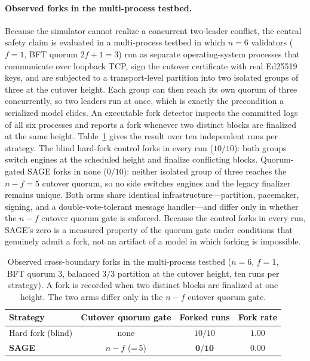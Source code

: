 \documentclass[journal]{IEEEtran}
\begin{document}
\paragraph{Observed forks in the multi-process testbed.}
Because the simulator cannot realize a concurrent two-leader conflict, the central safety claim
is evaluated in a multi-process testbed in which $n{=}6$ validators ($f{=}1$, BFT quorum
$2f{+}1{=}3$) run as separate operating-system processes that communicate over loopback TCP, sign
the cutover certificate with real Ed25519 keys, and are subjected to a transport-level partition
into two isolated groups of three at the cutover height. Each group can then reach its own quorum
of three concurrently, so two leaders run at once, which is exactly the precondition a serialized
model elides. An executable fork detector inspects the committed logs of all six processes and
reports a fork whenever two distinct blocks are finalized at the same height. Table~\ref{tab:testbed}
gives the result over ten independent runs per strategy. The blind hard-fork control forks in
every run ($10/10$): both groups switch engines at the scheduled height and finalize conflicting
blocks. Quorum-gated SAGE forks in none ($0/10$): neither isolated group of three reaches the
$n{-}f{=}5$ cutover quorum, so no side switches engines and the legacy finalizer remains unique.
Both arms share identical infrastructure---partition, pacemaker, signing, and a
double-vote-tolerant message handler---and differ only in whether the $n{-}f$ cutover quorum gate
is enforced. Because the control forks in every run, SAGE's zero is a measured property of the
quorum gate under conditions that genuinely admit a fork, not an artifact of a model in which
forking is impossible.

\begin{table}[t]
\centering
\caption{Observed cross-boundary forks in the multi-process testbed ($n{=}6$, $f{=}1$, BFT
quorum $3$, balanced $3/3$ partition at the cutover height, ten runs per strategy). A fork is
recorded when two distinct blocks are finalized at one height. The two arms differ only in the
$n{-}f$ cutover quorum gate.}
\label{tab:testbed}
\setlength{\tabcolsep}{6pt}
\renewcommand{\arraystretch}{1.2}
\footnotesize
\begin{tabular}{lccc}
\toprule
Strategy & Cutover quorum gate & Forked runs & Fork rate \\
\midrule
Hard fork (blind) & none           & $10/10$         & $1.00$ \\
\textbf{SAGE}     & $n{-}f$ (=\,5)  & $\mathbf{0/10}$ & $\mathbf{0.00}$ \\
\bottomrule
\end{tabular}
\end{table}
\end{document}
